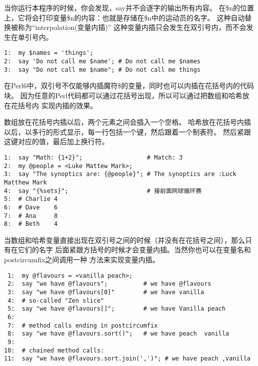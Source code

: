 \documentclass{ctexart}
\begin{document}
当你运行本程序的时候，你会发现，say并不会逐字的输出所有内容。
在\$n的位置上，它将会打印变量\$n的内容：也就是存储在\$n中的运动员的名字。
这种自动替换被称为“interpolation(变量内插)”
这种变量内插只会发生在双引号内，而不会发生在单引号内。

\begin{lstlisting}
1:  my $names = 'things';
2:  say 'Do not call me $name'; # Do not call me $names
3:  say "Do not call me $name"; # Do not call me things
\end{lstlisting}
在Perl6中，双引号不仅能够内插魔符\$的变量，同时也可以内插在花括号内的代码块。
因为任意的Perl代码都可以通过花括号出现，所以可以通过把数组和哈希放在花括号内
实现内插的效果。

数组放在花括号内插以后，两个元素之间会插入一个空格。
哈希放在花括号内插以后，以多行的形式显示，每一行包括一个键，然后跟着一个制表符。
然后紧跟这键对应的值，最后加上换行符。

\begin{lstlisting}
1:  say "Math: {1+2}";                  # Match: 3
2:  my @people = <Luke Mattew Mark>;
3:  say "The synoptics are: {@people}"; # The synoptics are :Luck Matthew Mark
4:  say "{%sets}";                      # 接前面网球循环赛
5:  # Charlie 4
6:  # Dave    6
7:  # Ana     8
8:  # Beth    4
\end{lstlisting}
当数组和哈希变量直接出现在双引号之间的时候（并没有在花括号之间），那么只有在它们的名字
后面紧跟方括号的时候才会变量内插。当然你也可以在变量名和postcircumfix之间调用一种
方法来实现变量内插。

\begin{lstlisting}
 1:  my @flavours = <vanilla peach>;
 2:  say "we have @flavours";          # we have @flavours
 3:  say "we have @flavours[0]"        # we have vanilla
 4:  # so-called "Zen slice"
 5:  say "we have @flavours[]";        # we have Vanilla peach 
 6:  
 7:  # method calls ending in postcircumfix
 8:  say "we have @flavours.sort()";   # we have peach  vanilla
 9:  
10:  # chained method calls:
11:  say "we have @flavours.sort.join(',')"; # we have peach ,vanilla
\end{lstlisting}
\end{document}
